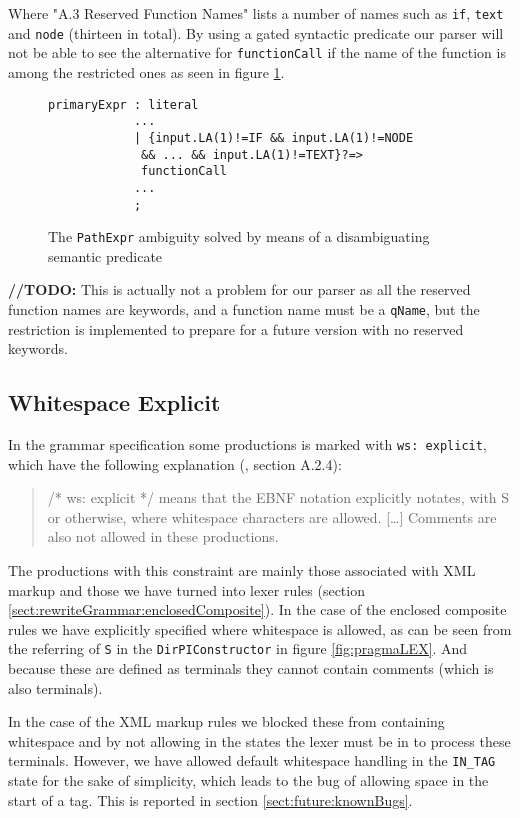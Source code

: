 Where "A.3 Reserved Function Names" lists a number of names such as \verb!if!, \verb!text! and \verb!node! (thirteen in total). By using a gated syntactic predicate our parser will not be able to see the alternative for \verb!functionCall! if the name of the function is among the restricted ones as seen in figure \ref{fig:reservedFunction}.

\begin{figure}[h!]
\begin{verbatim}
primaryExpr : literal 
            ...
            | {input.LA(1)!=IF && input.LA(1)!=NODE
             && ... && input.LA(1)!=TEXT}?=>
             functionCall 
            ...
            ;
\end{verbatim}
\caption[The \texttt{PathExpr} ambiguity solved]{The \texttt{PathExpr} ambiguity solved by means of a disambiguating semantic predicate}
\label{fig:reservedFunction}
\end{figure}

\textbf{\LARGE //TODO:} This is actually not a problem for our parser as all the reserved function names are keywords, and a function name must be a \verb!qName!, but the restriction is implemented to prepare for a future version with no reserved keywords.

\subsection{Whitespace Explicit}
\label{sect:implementation:whitespace}
In the grammar specification some productions is marked with \verb!ws: explicit!, which have the following explanation (\cite{w3c00}, section A.2.4):
\begin{quote}
/* ws: explicit */ means that the EBNF notation explicitly notates, with S or otherwise, where whitespace characters are allowed. [\ldots] Comments are also not allowed in these productions.
\end{quote} 

The productions with this constraint are mainly those associated with XML markup and those we have turned into lexer rules (section \ref{sect:rewriteGrammar:enclosedComposite}). In the case of the enclosed composite rules we have explicitly specified where whitespace is allowed, as can be seen from the referring of \verb!S! in the \verb!DirPIConstructor! in figure \ref{fig:pragmaLEX}. And because these are defined as terminals they cannot contain comments (which is also terminals).

In the case of the XML markup rules we blocked these from containing whitespace and by not allowing in the states the lexer must be in to process these terminals. However, we have allowed default whitespace handling in the \verb!IN_TAG! state for the sake of simplicity, which leads to the bug of allowing space in the start of a tag. This is reported in section \ref{sect:future:knownBugs}.

